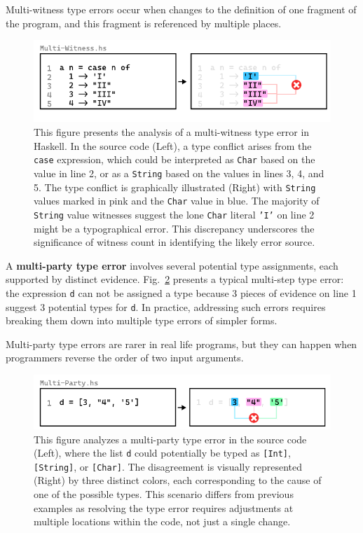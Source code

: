 \documentclass[pdflatex,sn-mathphys-num]{sn-jnl}%
\begin{document}
Multi-witness type errors occur when changes to the definition of one fragment of the program, and this fragment is referenced by multiple places. 


\begin{figure}[htbp]
\centering  \includegraphics[width=\linewidth]{Multi-Witness}
  \caption[This illustration depicts a multi-witness type error in Haskell]{
    \label{fig:multi-witness-example}
    This figure presents the analysis of a multi-witness type error in Haskell. In the source code (Left), a type conflict arises from the \texttt{case} expression, which could be interpreted as \texttt{Char} based on the value in line 2, or as a \texttt{String} based on the values in lines 3, 4, and 5. The type conflict is graphically illustrated (Right) with \texttt{String} values marked in pink and the \texttt{Char} value in blue. The majority of \texttt{String} value witnesses suggest the lone \texttt{Char} literal \texttt{'I'} on line 2 might be a typographical error. This discrepancy underscores the significance of witness count in identifying the likely error source.}
\end{figure}

A \textbf{multi-party type error} involves several potential type assignments, each supported by distinct evidence.  Fig.~\ref{fig:multi-party-example} presents a typical multi-step type error: the expression \texttt{d} can not be assigned a type because 3 pieces of evidence on line 1 suggest 3 potential types for \texttt{d}. In practice, addressing such errors requires breaking them down into multiple type errors of simpler forms. 

Multi-party type errors are rarer in real life programs, but they can happen when programmers reverse the order of two input arguments. 

\begin{figure}[htbp]
\centering  \includegraphics[width=\linewidth]{Multi-Party}
  \caption[This illustration depicts a multi-party type error in Haskell]{
    \label{fig:multi-party-example}
    This figure analyzes a multi-party type error in the source code (Left), where the list \texttt{d} could potentially be typed as \texttt{[Int]}, \texttt{[String]}, or \texttt{[Char]}. The disagreement is visually represented (Right) by three distinct colors, each corresponding to the cause of one of the possible types. This scenario differs from previous examples as resolving the type error requires adjustments at multiple locations within the code, not just a single change.
       }
\end{figure}
  
\end{document}
